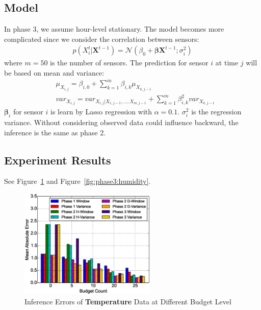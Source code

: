 \documentclass[12pt]{article}  %
\theoremstyle{definition}
\theoremstyle{remark}
\begin{document}
\subsection{Model}
In phase 3, we assume hour-level stationary.
The model becomes more complicated since we consider the correlation between sensors:
\begin{align}
        p(X^{t}_i|\mathbf{X}^{t-1}) = \mathcal{N}(\beta_0 + \bm{\beta}\mathbf{X}^{t-1}; \sigma_i^2)
\end{align}
where $m=50$ is the number of sensors.
The prediction for sensor $i$ at time $j$ will be based on mean and variance:
\begin{align}
        & \mu_{X_{i,j}} = \beta_{i,0} + \sum_{k=1}^{m} \beta_{i,k} \mu_{X_{k,j-1}} \\
        & var_{X_{i,j}} = var_{X_{i,j}|X_{1,j-1},\ldots, X_{m,j-1}} + \sum_{k=1}^{m}\beta_{i,k}^2 var_{X_{k,j-1}}
\end{align}
$\bm{\beta}_i$ for sensor $i$ is learn by Lasso regression with $\alpha = 0.1$.
$\sigma_i^2$ is the regression variance.
Without considering observed data could influence backward,
the inference is the same as phase 2.

\subsection{Experiment Results}
See Figure~\ref{fig:phase3:temperature} and Figure~\ref{fig:phase3:humidity}.

\begin{figure}[H]
\centering
        \includegraphics[width=0.58\textwidth]{../phase3/temperature_err}
        \caption{Inference Errors of \textbf{Temperature} Data at Different Budget Level}
\label{fig:phase3:temperature}
\end{figure}
\end{document}
